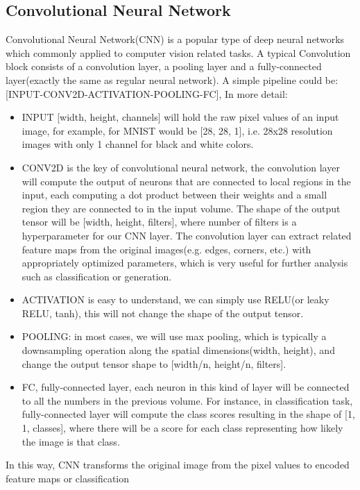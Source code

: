 \subsection{Convolutional Neural Network}
\nocite{cs231n}
Convolutional Neural Network(CNN) is a popular type of deep neural networks which commonly applied to computer
vision related tasks. A typical Convolution block consists of a convolution layer, a pooling layer and a 
fully-connected layer(exactly the same as regular neural network). A simple pipeline could be:
[INPUT-CONV2D-ACTIVATION-POOLING-FC], In more detail:
\begin{itemize}
    \item INPUT [width, height, channels] will hold the raw pixel values of an input image, for example, for MNIST
    would be [28, 28, 1], i.e. 28x28 resolution images with only 1 channel for black and white colors.
    \item CONV2D is the key of convolutional neural network, the convolution
    layer will compute the output of neurons that are connected to local regions in the input, each 
    computing a dot product between their weights and a small region they are connected to in the input volume.
    The shape of the output tensor will be [width, height, filters], where number of filters is a hyperparameter for our 
    CNN layer. The convolution layer can extract related feature maps from the original images(e.g. edges, corners, etc.)
    with appropriately optimized parameters, which is very useful for further analysis such as classification or 
    generation. 
    \item ACTIVATION is easy to understand, we can simply use RELU(or leaky RELU, tanh), this will not change the 
    shape of the output tensor.
    \item POOLING: in most cases, we will use max pooling, which is typically a downsampling operation along the 
    spatial dimensions(width, height), and change the output tensor shape to [width/n, height/n, filters].
    \item FC, fully-connected layer, each neuron in this kind of layer will be connected to 
    all the numbers in the previous volume.
    For instance, in classification task, fully-connected layer will compute the class scores 
    resulting in the shape of [1, 1, classes], where there will be a score for each class representing 
    how likely the image is that class.
\end{itemize}
In this way, CNN transforms the original image from the pixel values to encoded feature maps or classification 
